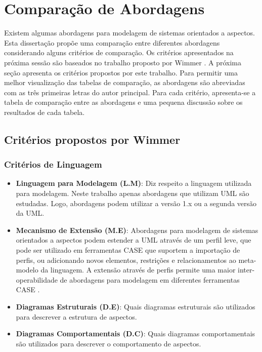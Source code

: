 \section{Comparação de Abordagens}

Existem algumas abordagens para modelagem de sistemas orientados a aspectos. Esta dissertação propõe uma comparação entre diferentes abordagens
considerando alguns critérios de comparação. Os critérios apresentados na próxima sessão são baseados no trabalho proposto por Wimmer
\cite{wimmer:2011:SUA:1978802.1978807}. A próxima seção apresenta os critérios propostos por este trabalho. Para permitir uma
melhor visualização das tabelas de comparação, as abordagens são abreviadas com as três primeiras letras do autor principal. 
Para cada critério, apresenta-se a tabela de comparação entre as abordagens e uma pequena discussão sobre os resultados de
cada tabela.

\subsection{Critérios propostos por Wimmer}

\subsubsection{Critérios de Linguagem}

\begin{itemize}
	\item \textbf{Linguagem para Modelagem (L.M)}: Diz respeito a linguagem utilizada para modelagem. Neste trabalho apenas abordagens que utilizam UML
	são estudadas. Logo, abordagens podem utilizar a versão 1.x ou a segunda versão da UML.
	\item \textbf{Mecanismo de Extensão (M.E)}: Abordagens para modelagem de sistemas orientados a aspectos podem estender a UML através de um perfil
	leve, que pode ser utilizado em ferramentas CASE que suportem a importação de perfis, ou adicionando novos elementos, restrições e relacionamentos ao
	meta-modelo da linguagem. A extensão através de perfis permite uma maior inter-operabilidade de abordagens para modelagem em diferentes ferramentas
	CASE \cite{Booch:2005:UML:1088874}.
	\item \textbf{Diagramas Estruturais (D.E)}: Quais diagramas estruturais são utilizados para descrever a estrutura de aspectos.
	\item \textbf{Diagramas Comportamentais (D.C)}: Quais diagramas comportamentais são utilizados para descrever o comportamento de aspectos.
\end{itemize}

